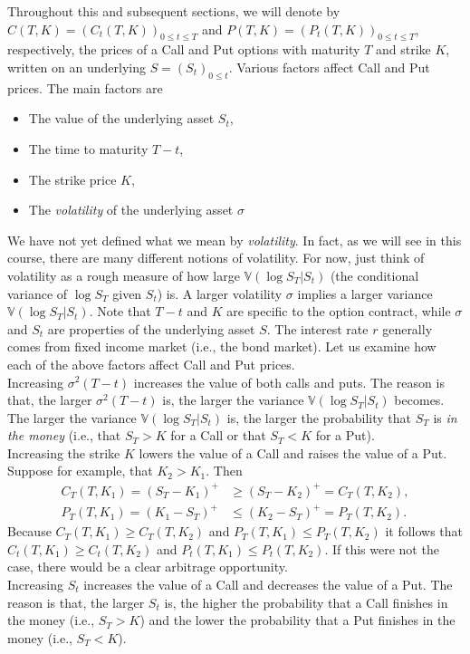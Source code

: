 \documentclass[12pt]{book}
\numberwithin{equation}{chapter}
\theoremstyle{plain}
\numberwithin{theorem}{section}
\theoremstyle{definition}
\numberwithin{exercise}{chapter}
\newcommand{\<}{\langle}
\renewcommand{\>}{\rangle}
\renewcommand{\(}{\left(}
\renewcommand{\)}{\right)}
\renewcommand{\[}{\left[}
\renewcommand{\]}{\right]}
\newcommand\Vb{\mathds{V}}
\newcommand\sig{\sigma}
\theoremstyle{definition}
\numberwithin{question}{section}
\begin{document}
Throughout this and subsequent sections, we will denote by $C(T,K) = (C_t(T,K))_{0 \leq t \leq T}$ and $P(T,K) = (P_t(T,K))_{0 \leq t \leq T}$, respectively, the prices of a Call and Put options with maturity $T$ and strike $K$, written on an underlying $S = (S_t)_{0 \leq t}$. 
Various factors affect Call and Put prices.  The main factors are
\begin{itemize}
\item The value of the underlying asset $S_t$,
\item The time to maturity $T-t$,
\item The strike price $K$,
\item The \textit{volatility} of the underlying asset $\sigma$
\end{itemize}
We have not yet defined what we mean by \textit{volatility}.  In fact, as we will see in this course, there are many different notions of volatility.  For now, just think of volatility as a rough measure of how large $\Vb( \log S_T | S_t) $ (the conditional variance of $\log S_T$ given $S_t$) is.  A larger volatility $\sig$ implies a larger variance $\Vb ( \log S_T | S_t)$.  
Note that $T-t$ and $K$ are specific to the option contract, while $\sigma$ and $S_t$ are properties of the underlying asset $S$. The interest rate $r$ generally comes from fixed income market (i.e., the bond market).  Let us examine how each of the above factors affect Call and Put prices.
\\[0.5em]
Increasing $\sig^2 (T-t)$ increases the value of both calls and puts.  The reason is that, the larger $\sig^2 (T-t)$ is, the larger the variance $\Vb( \log S_T | S_t)$ becomes.  The larger the variance $\Vb( \log S_T | S_t)$ is, the larger the probability that $S_T$ is \textit{in the money} (i.e., that $S_T > K$ for a Call or that $S_T < K$ for a Put).
\\[0.5em]
Increasing the strike $K$ lowers the value of a Call and raises the value of a Put.  Suppose for example, that $K_2 > K_1$.  Then 
\begin{align}
C_T(T,K_1) = (S_T - K_1)^+ 
	&\geq (S_T - K_2)^+ = C_T(T,K_2) , \\
P_T(T,K_1) = (K_1 - S_T)^+ 
	&\leq (K_2- S_T)^+ = P_T(T,K_2) .
\end{align}
Because $C_T(T,K_1) \geq C_T(T,K_2)$ and $P_T(T,K_1) \leq P_T(T,K_2)$ it follows that $C_t(T,K_1) \geq C_t(T,K_2)$ and $P_t(T,K_1) \leq P_t(T,K_2)$.  If this were not the case, there would be a clear arbitrage opportunity.
\\[0.5em]
Increasing $S_t$ increases the value of a Call and decreases the value of a Put.  The reason is that, the larger $S_t$ is, the higher the probability that a Call finishes in the money (i.e., $S_T > K$) and the lower the probability that a Put finishes in the money (i.e., $S_T < K$).
\end{document}

